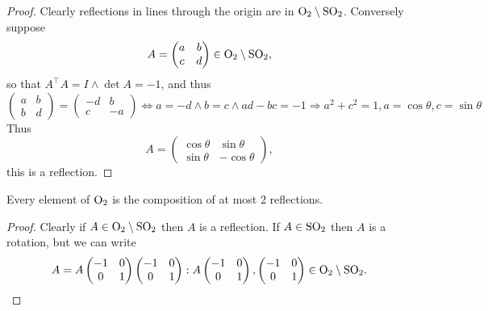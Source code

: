 \documentclass[a4paper]{article}
\begin{document}
    \begin{proof}
        Clearly reflections in lines through the origin are in $ \mathrm{O}_2 \setminus \mathrm{SO}_2 $. Conversely suppose
        \[
            A=\begin{pmatrix}
                a&b\\c&d
            \end{pmatrix}\in \mathrm{O}_2 \setminus \mathrm{SO}_2,
        \]
        so that $ A^\top A=I \land \det A=-1 $, and thus 
        \[
            \begin{pmatrix}
                a&b\\b&d
            \end{pmatrix}=\begin{pmatrix}
                -d&b\\c&-a
            \end{pmatrix} \Longleftrightarrow a=-d \land b=c \land ad-bc=-1 \Longrightarrow a^2+c^2=1, a=\cos \theta,c=\sin \theta
        \]
        Thus 
        \[
            A = \begin{pmatrix}
                \cos \theta& \sin \theta\\
                \sin \theta& -\cos \theta
            \end{pmatrix},
        \]
        this is a reflection.
    \end{proof}
    \begin{corollary}\label{col:7.20}
            Every element of $\mathrm{O}_2$ is the composition of at most 2 reflections.
    \end{corollary}
    \begin{proof}
        Clearly if $ A\in  \mathrm{O}_2 \setminus \mathrm{SO}_2$ then $A$ is a reflection. If $ A\in \mathrm{SO}_2 $ then $A$ is a rotation, but we can write 
        \[
            A=A\begin{pmatrix}
                -1&0\\
                0&1
            \end{pmatrix}\begin{pmatrix}
                -1&0\\
                0&1
            \end{pmatrix}: A\begin{pmatrix}
                -1&0\\
                0&1
            \end{pmatrix},\begin{pmatrix}
                -1&0\\
                0&1
            \end{pmatrix}\in \mathrm{O}_2 \setminus \mathrm{SO}_2.
        \]
    \end{proof}
\end{document}
